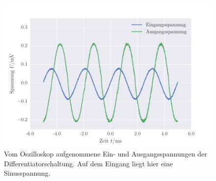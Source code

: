 \FloatBarrier
\begin{figure}[!h]
\centering
\includegraphics[scale=0.75]{../Grafiken/Differentiator_Oszilloskop_Sinus.pdf}
\caption{Vom Oszilloskop aufgenommene Ein- und Ausgangsspannungen der Differentiatorschaltung. Auf dem Eingang
	liegt hier eine Sinusspannung.\label{fig:differentiator_oszilloskop_sinus}}
\end{figure}
\FloatBarrier